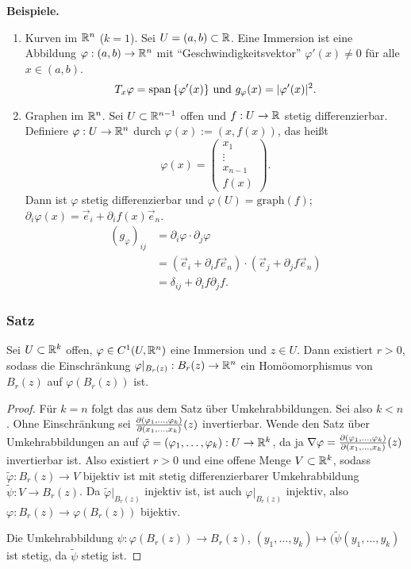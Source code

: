 \documentclass[
 a4paper,
 12pt,
 parskip=half
 ]{scrartcl}
\theoremstyle{plain}
\theoremstyle{definition}
\numberwithin{equation}{section}
\begin{document}
\textbf{Beispiele.}
\begin{enumerate}
 \item Kurven im $\mathbb{R}^n$ ($k=1$). Sei $U = (a,b) \subset \mathbb{R}$. Eine Immersion ist eine Abbildung $\varphi:(a,b) \to \mathbb{R}^n$ mit ``Geschwindigkeitsvektor'' $\varphi'(x) \ne 0$ für alle $x \in (a,b)$.
 \[ T_x \varphi = \mathrm{span}\,\{ \varphi'(x)\} \text{ und } g_\varphi(x) = | \varphi'(x) |^2. \]
 \item Graphen im $\mathbb{R}^n$. Sei $U \subset \mathbb{R}^{n-1}$ offen und $f: U \to \mathbb{R}$ stetig differenzierbar. Definiere $\varphi: U \to \mathbb{R}^n$ durch $\varphi(x) := (x, f(x))$, das heißt 
 \[ \varphi(x) = \begin{pmatrix} x_1 \\ \vdots \\ x_{n-1} \\ f(x) \end{pmatrix}. \]
 Dann ist $\varphi$ stetig differenzierbar und $\varphi(U) =  \mathrm{graph}(f)$; $\partial_i \varphi(x) = \vec{e}_i + \partial_i f(x) \vec{e}_n$.
 \[ \begin{aligned}
     (g_\varphi)_{ij} &= \partial_i \varphi \cdot \partial_j \varphi \\
     &= (\vec{e}_i + \partial_i f \vec{e}_n) \cdot (\vec{e}_j + \partial_j f \vec{e}_n) \\
     &= \delta_{ij} + \partial_i f \partial_j f.
    \end{aligned} \]
\end{enumerate}

\subsubsection{Satz}
\begin{thm}
 Sei $U \subset \mathbb{R}^k$ offen, $\varphi \in C^1(U, \mathbb{R}^n)$ eine Immersion und $z \in U$. Dann existiert $r > 0$, sodass die Einschränkung $\varphi|_{B_r(z)} : B_r(z) \to \mathbb{R}^n$ ein Homöomorphismus von $B_r(z)$ auf $\varphi(B_r(z))$ ist.
\end{thm}

\begin{proof}
 Für $k = n$ folgt das aus dem Satz über Umkehrabbildungen. Sei also $k < n$. Ohne Einschränkung sei $\frac{\partial (\varphi_{1}, \ldots, \varphi_{k})}{\partial (x_1, \ldots, x_k)}(z)$ invertierbar. Wende den Satz über Umkehrabbildungen an auf $\tilde{\varphi} = ( \varphi_1, \ldots, \varphi_k): U \to \mathbb{R}^k$, da ja $\nabla \varphi = \frac{\partial (\varphi_{1}, \ldots, \varphi_{k})}{\partial (x_1, \ldots, x_k)}(z)$ invertierbar ist. Also existiert $r > 0$ und eine offene Menge $V \subset \mathbb{R}^k$, sodass $\tilde{\varphi}: B_r(z) \to V$ bijektiv ist mit stetig differenzierbarer Umkehrabbildung $\tilde{\psi}: V \to B_r(z)$. Da $\tilde{\varphi}|_{B_r(z)}$ injektiv ist, ist auch $\varphi|_{B_r(z)}$ injektiv, also $\varphi:B_r(z) \to \varphi(B_r(z))$ bijektiv.
 
 Die Umkehrabbildung $\psi : \varphi(B_r(z)) \to B_r(z)$, $(y_1, \ldots, y_k) \mapsto (\tilde{\psi}(y_1, \ldots, y_k)$ ist stetig, da $\tilde{\psi}$ stetig ist.
\end{proof}
\end{document}
